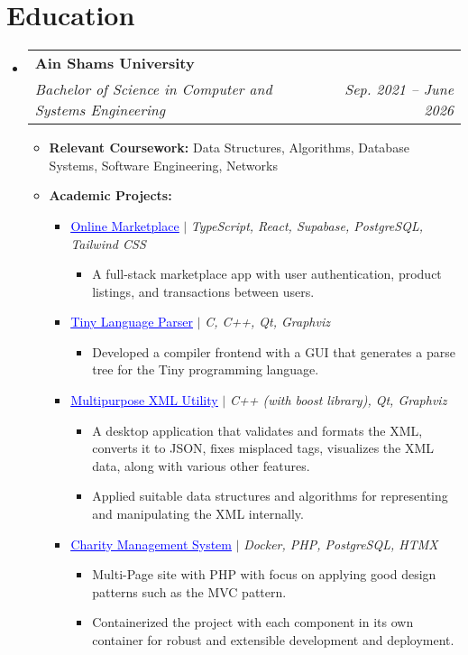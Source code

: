 \documentclass[letterpaper,11pt]{article}
\makeatletter
\newcommand{\resumeItem}[1]{
  \item\small{
    {#1 \vspace{-2pt}}
  }
}
\newcommand{\resumeSubheading}[4]{
  \vspace{-2pt}\item
    \begin{tabular*}{0.97\textwidth}[t]{l@{\extracolsep{\fill}}r}
      \textbf{#1} & #2 \\
      \textit{\small#3} & \textit{\small #4} \\
    \end{tabular*}\vspace{-7pt}
}
\newcommand{\resumeSubHeadingListStart}{\begin{itemize}[leftmargin=0.15in, label={}]}
\newcommand{\resumeSubHeadingListEnd}{\end{itemize}}
\newcommand{\resumeItemListStart}{\begin{itemize}}
\newcommand{\resumeItemListEnd}{\end{itemize}\vspace{-5pt}}
\makeatother
\begin{document}
\section{Education}
  \resumeSubHeadingListStart
    \resumeSubheading
      {Ain Shams University}{}
      {Bachelor of Science in Computer and Systems Engineering}{Sep. 2021 -- June 2026}
      \resumeItemListStart
        \resumeItem{\textbf{Relevant Coursework:} Data Structures, Algorithms, Database Systems, Software Engineering, Networks}
        \resumeItem{\textbf{Academic Projects:}}
        \begin{itemize}
          \item \small{\href{https://github.com/KhalidAlansary/Jelato}{\textcolor{blue}{\underline{Online Marketplace}}}} $|$ \emph{TypeScript, React, Supabase, PostgreSQL, Tailwind CSS}
          \begin{itemize}
            \item A full-stack marketplace app with user authentication, product listings, and transactions between users.
          \end{itemize}
          \item \small{\href{https://github.com/KhalidAlansary/tiny-parser}{\textcolor{blue}{\underline{Tiny Language Parser}}}} $|$ \emph{C, C++, Qt, Graphviz}
          \begin{itemize}
            \item Developed a compiler frontend with a GUI that generates a parse tree for the Tiny programming language.
          \end{itemize}
          \item \small{\href{https://github.com/KhalidAlansary/ugly-duckling}{\textcolor{blue}{\underline{Multipurpose XML Utility}}}} $|$ \emph{C++ (with boost library), Qt, Graphviz}
          \begin{itemize}
            \item A desktop application that validates and formats the XML, converts it to JSON, fixes misplaced tags, visualizes the XML data, along with various other features.
            \item Applied suitable data structures and algorithms for representing and manipulating the XML internally.
          \end{itemize}
          \item \small{\href{https://github.com/KhalidAlansary/Charity}{\textcolor{blue}{\underline{Charity Management System}}}} $|$ \emph{Docker, PHP, PostgreSQL, HTMX}
          \begin{itemize}
            \item Multi-Page site with PHP with focus on applying good design patterns such as the MVC pattern.
            \item Containerized the project with each component in its own container for robust and extensible development and deployment.
          \end{itemize}
        \end{itemize}
      \resumeItemListEnd
  \resumeSubHeadingListEnd
\end{document}
